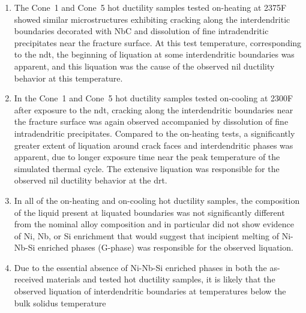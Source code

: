 \begin{enumerate}
\item The Cone~1 and Cone~5 hot ductility samples tested on-heating at 2375\textdegree{}F showed similar microstructures exhibiting cracking along the interdendritic boundaries decorated with NbC and dissolution of fine intradendritic precipitates near the fracture surface. At this test temperature, corresponding to the \gls{ndt}, the beginning of liquation at some interdendritic boundaries was apparent, and this liquation was the cause of the observed nil ductility behavior at this temperature.
\item In the Cone~1 and Cone~5 hot ductility samples tested on-cooling at 2300\textdegree{}F after exposure to the \gls{ndt}, cracking along the interdendritic boundaries near the fracture surface was again observed accompanied by dissolution of fine intradendritic precipitates. Compared to the on-heating tests, a significantly greater extent of liquation around crack faces and interdendritic phases was apparent, due to longer exposure time near the peak temperature of the simulated thermal cycle. The extensive liquation was responsible for the observed nil ductility behavior at the \gls{drt}.
\item In all of the on-heating and on-cooling hot ductility samples, the composition of the liquid present at liquated boundaries was not significantly different from the nominal alloy composition and in particular did not show evidence of Ni, Nb, or Si enrichment that would suggest that incipient melting of Ni-Nb-Si enriched phases (G-phase) was responsible for the observed liquation.
\item Due to the essential absence of Ni-Nb-Si enriched phases in both the as-received materials and tested hot ductility samples, it is likely that the observed liquation of interdendritic boundaries at temperatures below the bulk solidus temperature

\end{enumerate}


